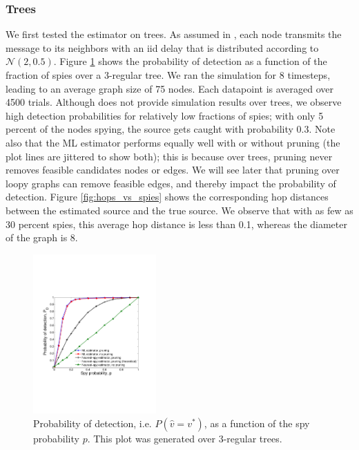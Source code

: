 \subsubsection{Trees}
We first tested the estimator on trees. As assumed in \cite{pinto}, each node transmits the message to its neighbors with an iid delay that is distributed according to $\mathcal N(2,0.5)$. Figure \ref{fig:pd_vs_spies} shows the probability of detection as a function of the fraction of spies over a 3-regular tree. We ran the simulation for 8 timesteps, leading to an average graph size of 75 nodes. Each datapoint is averaged over 4500 trials. Although \cite{pinto} does not provide simulation results over trees, we observe high detection probabilities for relatively low fractions of spies; with only 5 percent of the nodes spying, the source gets caught with probability 0.3. Note also that the ML estimator performs equally well with or without pruning (the plot lines are jittered to show both); this is because over trees, pruning never removes feasible candidates nodes or edges. We will see later that pruning over loopy graphs can remove feasible edges, and thereby impact the probability of detection. Figure \ref{fig:hops_vs_spies} shows the corresponding hop distances between the estimated source and the true source. We observe that with as few as 30 percent spies, this average hop distance is less than 0.1, whereas the diameter of the graph is 8. 
\begin{figure}
\centering
\includegraphics[height = 2.4in]{figures/pd_vs_spies}
\caption{Probability of detection, i.e. $P(\hat v = v^*)$, as a function of the spy probability $p$. This plot was generated over 3-regular trees. %
}
\label{fig:pd_vs_spies}
\end{figure}

